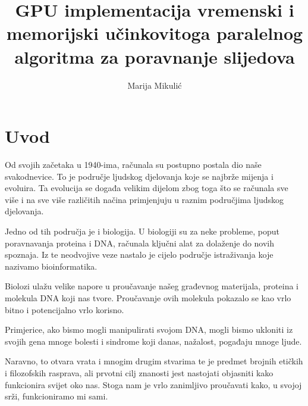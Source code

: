 \documentclass[times, utf8, zavrsni, numeric]{fer}
\begin{document}

\title{GPU implementacija vremenski i memorijski učinkovitoga paralelnog algoritma za poravnanje slijedova}

\author{Marija Mikulić}

\maketitle

\izvornik


\tableofcontents

\listoftables

\listoffigures

\chapter{Uvod}

\indent

Od svojih začetaka u 1940-ima, računala su postupno postala dio naše svakodnevice. To je područje ljudskog djelovanja koje se najbrže mijenja i evoluira. Ta evolucija se događa velikim dijelom zbog toga što se računala sve više i na sve više različitih načina primjenjuju u raznim područjima ljudskog djelovanja.

Jedno od tih područja je i biologija. U biologiji su za neke probleme, poput poravnavanja proteina i DNA, računala ključni alat za dolaženje do novih spoznaja. Iz te neodvojive veze nastalo je cijelo područje istraživanja koje nazivamo bioinformatika.

Biolozi ulažu velike napore u proučavanje našeg građevnog materijala, proteina i molekula DNA koji nas tvore. Proučavanje ovih molekula pokazalo se kao vrlo bitno i potencijalno vrlo korisno.

Primjerice, ako bismo mogli manipulirati svojom DNA, mogli bismo ukloniti iz svojih gena mnoge bolesti i sindrome koji danas, nažalost, pogađaju mnoge ljude.

Naravno, to otvara vrata i mnogim drugim stvarima te je predmet brojnih etičkih i filozofskih rasprava, ali prvotni cilj znanosti jest nastojati objasniti kako funkcionira svijet oko nas. Stoga nam je vrlo zanimljivo proučavati kako, u svojoj srži, funkcioniramo mi sami.
\end{document}
